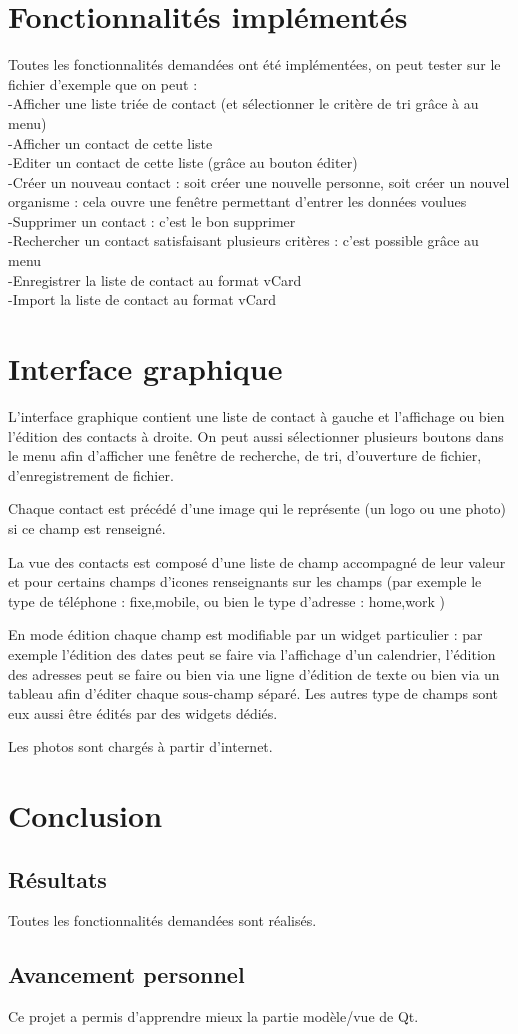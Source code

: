 \documentclass{report}
\begin{document}
\chapter{Fonctionnalités implémentés}
\par
Toutes les fonctionnalités demandées ont été implémentées, on peut tester sur le fichier d'exemple que on peut :\\
-Afficher une liste triée de contact (et sélectionner le critère de tri grâce à au menu)\\
-Afficher un contact de cette liste\\
-Editer un contact de cette liste (grâce au bouton éditer)\\
-Créer un nouveau contact : soit créer une nouvelle personne, soit créer un nouvel organisme : cela ouvre une fenêtre permettant d'entrer les données voulues\\
-Supprimer un contact : c'est le bon supprimer\\
-Rechercher un contact satisfaisant plusieurs critères : c'est possible grâce au menu\\
-Enregistrer la liste de contact au format vCard\\
-Import la liste de contact au format vCard\\

\chapter{Interface graphique}
\par
L'interface graphique contient une liste de contact à gauche et l'affichage ou bien l'édition des contacts à droite. On peut aussi sélectionner plusieurs boutons dans le menu afin d'afficher une fenêtre de recherche, de tri, d'ouverture de fichier, d'enregistrement de fichier.
\par
Chaque contact est précédé d'une image qui le représente (un logo ou une photo) si ce champ est renseigné.
\par
La vue des contacts est composé d'une liste de champ accompagné de leur valeur et pour certains champs d'icones renseignants sur les champs (par exemple le type de téléphone : fixe,mobile, ou bien le type d'adresse : home,work )
\par
En mode édition chaque champ est modifiable par un widget particulier : par exemple l'édition des dates peut se faire via l'affichage d'un calendrier, l'édition des adresses peut se faire ou bien via une ligne d'édition de texte ou bien via un tableau afin d'éditer chaque sous-champ séparé. Les autres type de champs sont eux aussi être édités par des widgets dédiés.
\par
Les photos sont chargés à partir d'internet.


\chapter{Conclusion}
\section{Résultats}
\par
Toutes les fonctionnalités demandées sont réalisés.
\section{Avancement personnel}
\par
Ce projet a permis d'apprendre mieux la partie modèle/vue de Qt.
\end{document}
